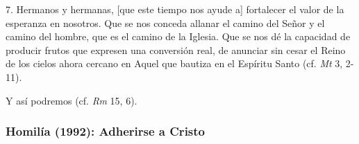\begin{body}
	7. Hermanos y hermanas, {[}que este tiempo nos ayude a{]} fortalecer el valor de la esperanza en nosotros. Que se nos conceda allanar el camino del Señor y el camino del hombre, que es el camino de la Iglesia. Que se nos dé la capacidad de producir frutos que expresen una conversión real, de anunciar sin cesar el Reino de los cielos ahora cercano en Aquel que bautiza en el Espíritu Santo (cf. \emph{Mt} 3, 2-11). 
	
	Y así podremos  (cf. \emph{Rm} 15, 6).
\end{body}

\subsubsection{Homilía (1992): Adherirse a Cristo}


